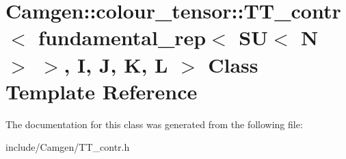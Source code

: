 \hypertarget{a00548}{}\section{Camgen\+:\+:colour\+\_\+tensor\+:\+:T\+T\+\_\+contr$<$ fundamental\+\_\+rep$<$ S\+U$<$ N $>$ $>$, I, J, K, L $>$ Class Template Reference}
\label{a00548}


The documentation for this class was generated from the following file\+:\begin{DoxyCompactItemize}
\item 
include/\+Camgen/T\+T\+\_\+contr.\+h\end{DoxyCompactItemize}
